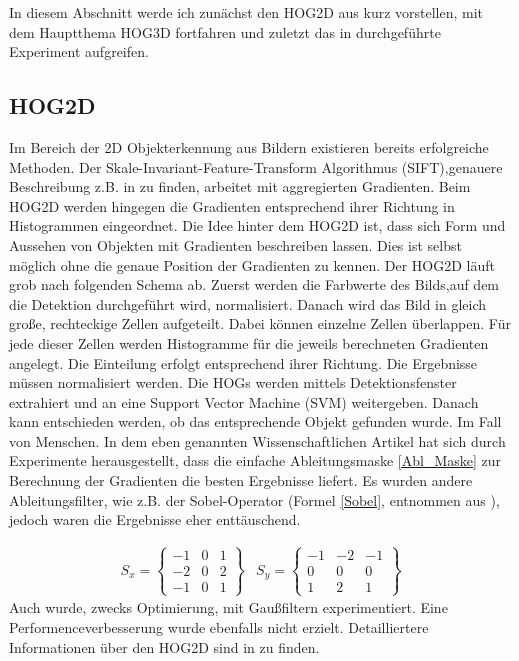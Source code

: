 In diesem Abschnitt werde ich zunächst den HOG2D aus \cite{dalal2005histograms} kurz vorstellen, mit dem Hauptthema HOG3D fortfahren und zuletzt das in \cite{scherer2010histograms} durchgeführte Experiment aufgreifen.

\subsection{HOG2D}
Im Bereich der 2D Objekterkennung aus Bildern existieren bereits erfolgreiche Methoden. Der Skale-Invariant-Feature-Transform Algorithmus (SIFT),genauere Beschreibung z.B. in \cite{Priese15}
zu finden, arbeitet mit aggregierten Gradienten. Beim HOG2D werden hingegen die Gradienten entsprechend
ihrer Richtung in Histogrammen eingeordnet.
\newline
Die Idee hinter dem HOG2D ist, dass sich Form und Aussehen von Objekten mit Gradienten beschreiben lassen.
Dies ist selbst möglich ohne die genaue Position der Gradienten zu kennen. Der HOG2D läuft grob nach folgenden Schema ab. Zuerst werden die Farbwerte des Bilds,auf dem die Detektion durchgeführt wird, normalisiert. Danach wird das Bild in gleich große, rechteckige Zellen aufgeteilt. Dabei können einzelne Zellen überlappen. Für jede dieser Zellen werden Histogramme für die jeweils berechneten Gradienten angelegt. Die Einteilung erfolgt entsprechend ihrer Richtung. Die Ergebnisse müssen normalisiert werden. Die HOGs werden mittels Detektionsfenster extrahiert und an eine Support Vector Machine (SVM) weitergeben. Danach kann entschieden werden, ob das entsprechende Objekt gefunden wurde. Im Fall von \cite{dalal2005histograms} Menschen. In dem eben genannten Wissenschaftlichen Artikel hat sich durch Experimente herausgestellt, dass die einfache Ableitungsmaske \ref{Abl_Maske} zur Berechnung der Gradienten die besten Ergebnisse liefert. Es wurden andere Ableitungsfilter, wie z.B. der Sobel-Operator (Formel \ref{Sobel}, entnommen aus \cite{Priese15}), jedoch waren die Ergebnisse eher enttäuschend. 

\begin{align}
\label{Sobel}
	S_x =	\begin{Bmatrix}
				-1 & 0 & 1 \\
				-2 & 0 & 2 \\
				-1 & 0 & 1 
			\end{Bmatrix}  &  
	S_y =	\begin{Bmatrix}
				-1 & -2 & -1 \\
				 0 & 0 &   0 \\
				 1 & 2 &   1 
			\end{Bmatrix}	
\end{align}
Auch wurde, zwecks Optimierung, mit Gaußfiltern experimentiert. Eine Performenceverbesserung wurde ebenfalls nicht erzielt. 
Detailliertere Informationen über den HOG2D sind in \cite{dalal2005histograms} zu finden.
 